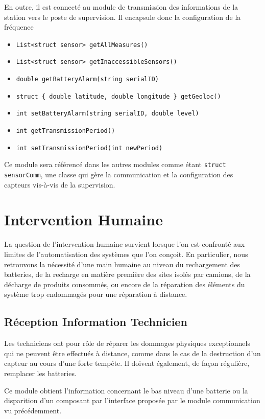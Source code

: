 En outre, il est connecté au module de transmission des informations de la station vers le poste de supervision. Il encapsule donc la configuration de la fréquence 

\begin{itemize}
\item \tt{List<struct sensor> getAllMeasures()}
\item \tt{List<struct sensor> getInaccessibleSensors()}
\item \tt{double getBatteryAlarm(string serialID)}
\item \tt{struct \{ double latitude, double longitude \} getGeoloc()}
\item \tt{int setBatteryAlarm(string serialID, double level)}
\item \tt{int getTransmissionPeriod()}
\item \tt{int setTransmissionPeriod(int newPeriod)}
\end{itemize}

Ce module sera référencé dans les autres modules comme étant \texttt{struct sensorComm}, une classe qui gère la communication et la configuration des capteurs vis-à-vis de la supervision.


\section{Intervention Humaine}

La question de l'intervention humaine survient lorsque l'on est confronté aux limites de l'automatisation des systèmes que l'on conçoit. En particulier, nous retrouvons la nécessité d'une main humaine au niveau du rechargement des batteries, de la recharge en matière première des sites isolés par camions, de la décharge de produits consommés, ou encore de la réparation des éléments du système trop endommagés pour une réparation à distance.

\subsection{Réception Information Technicien}

Les techniciens ont pour rôle de réparer les dommages physiques exceptionnels qui ne peuvent être effectués à distance, comme dans le cas de la destruction d'un capteur au cours d'une forte tempête. Il doivent également, de façon régulière, remplacer les batteries.

Ce module obtient l'information concernant le bas niveau d'une batterie ou la disparition d'un composant par l'interface proposée par le module communication vu précédemment.

